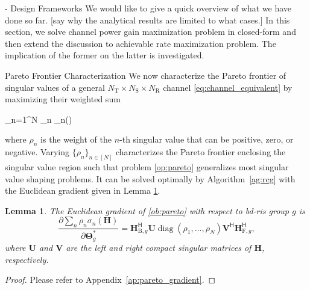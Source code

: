 \documentclass[journal]{IEEEtran}
\DeclareMathOperator{\diag}{diag}
\newtheorem{lemma}{Lemma}
\begin{document}
\begin{section}{- Design Frameworks}
	We would like to give a quick overview of what we have done so far.
	[say why the analytical results are limited to what cases.]
	In this section, we solve channel power gain maximization problem in closed-form and then extend the discussion to achievable rate maximization problem.
	The implication of the former on the latter is investigated.

	\begin{subsection}{Pareto Frontier Characterization}\label{sc:pareto_frontier}
		We now characterize the Pareto frontier of singular values of a general $N_\mathrm{T} \times N_\mathrm{S} \times N_\mathrm{R}$ channel \eqref{eq:channel_equivalent} by maximizing their weighted sum
		\begin{maxi!}
			{\scriptstyle{\mathbf{\Theta}}}{\sum_{n=1}^N \rho_n \sigma_n()}{\label{op:pareto}}{\label{ob:pareto}}
		\end{maxi!}
		where $\rho_n$ is the weight of the $n$-th singular value that can be positive, zero, or negative.
		Varying $\{\rho_n\}_{n \in [N]}$ characterizes the Pareto frontier enclosing the singular value region such that problem \eqref{op:pareto} generalizes most singular value shaping problems.
		It can be solved optimally by Algorithm~\ref{ag:rcg} with the Euclidean gradient given in Lemma \ref{lm:pareto_gradient}.

		\begin{lemma}\label{lm:pareto_gradient}
			The Euclidean gradient of \eqref{ob:pareto} with respect to \gls{bd}-\gls{ris} group $g$ is
			\begin{equation}
				\frac{\partial \sum_n \rho_n \sigma_n(\mathbf{H})}{\partial \mathbf{\Theta}_g^*} = \mathbf{H}_{\mathrm{B},g}^\mathsf{H} \mathbf{U} \diag(\rho_1,\ldots,\rho_N) \mathbf{V}^\mathsf{H} \mathbf{H}_{\mathrm{F},g}^\mathsf{H},
				\label{eq:pareto_gradient}
			\end{equation}
			where $\mathbf{U}$ and $\mathbf{V}$ are the left and right compact singular matrices of $\mathbf{H}$, respectively.
		\end{lemma}
		\begin{proof}
			Please refer to Appendix~\ref{ap:pareto_gradient}.
		\end{proof}


\end{subsection}
\end{section}
\end{document}
